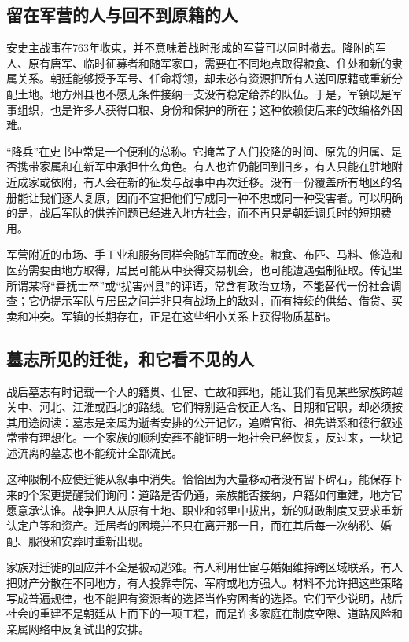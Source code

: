 \subsection{留在军营的人与回不到原籍的人}
安史主战事在763年收束，并不意味着战时形成的军营可以同时撤去。降附的军人、原有唐军、临时征募者和随军家口，需要在不同地点取得粮食、住处和新的隶属关系。朝廷能够授予军号、任命将领，却未必有资源把所有人送回原籍或重新分配土地。地方州县也不愿无条件接纳一支没有稳定给养的队伍。于是，军镇既是军事组织，也是许多人获得口粮、身份和保护的所在；这种依赖使后来的改编格外困难。

“降兵”在史书中常是一个便利的总称。它掩盖了人们投降的时间、原先的归属、是否携带家属和在新军中承担什么角色。有人也许仍能回到旧乡，有人只能在驻地附近成家或依附，有人会在新的征发与战事中再次迁移。没有一份覆盖所有地区的名册能让我们逐人复原，因而不宜把他们写成同一种不忠或同一种受害者。可以明确的是，战后军队的供养问题已经进入地方社会，而不再只是朝廷调兵时的短期费用。

军营附近的市场、手工业和服务同样会随驻军而改变。粮食、布匹、马料、修造和医药需要由地方取得，居民可能从中获得交易机会，也可能遭遇强制征取。传记里所谓某将“善抚士卒”或“扰害州县”的评语，常含有政治立场，不能替代一份社会调查；它仍提示军队与居民之间并非只有战场上的敌对，而有持续的供给、借贷、买卖和冲突。军镇的长期存在，正是在这些细小关系上获得物质基础。

\subsection{墓志所见的迁徙，和它看不见的人}
战后墓志有时记载一个人的籍贯、仕宦、亡故和葬地，能让我们看见某些家族跨越关中、河北、江淮或西北的路线。它们特别适合校正人名、日期和官职，却必须按其用途阅读：墓志是亲属为逝者安排的公开记忆，追赠官衔、祖先谱系和德行叙述常带有理想化。一个家族的顺利安葬不能证明一地社会已经恢复，反过来，一块记述流离的墓志也不能统计全部流民。

这种限制不应使迁徙从叙事中消失。恰恰因为大量移动者没有留下碑石，能保存下来的个案更提醒我们询问：道路是否仍通，亲族能否接纳，户籍如何重建，地方官愿意承认谁。战争把人从原有土地、职业和邻里中拔出，新的财政制度又要求重新认定户等和资产。迁居者的困境并不只在离开那一日，而在其后每一次纳税、婚配、服役和安葬时重新出现。

家族对迁徙的回应并不全是被动逃难。有人利用仕宦与婚姻维持跨区域联系，有人把财产分散在不同地方，有人投靠寺院、军府或地方强人。材料不允许把这些策略写成普遍规律，也不能把有资源者的选择当作穷困者的选择。它们至少说明，战后社会的重建不是朝廷从上而下的一项工程，而是许多家庭在制度空隙、道路风险和亲属网络中反复试出的安排。

